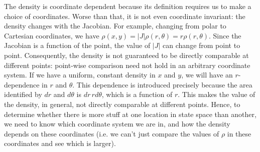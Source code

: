 \documentclass[letterpaper]{article}
\begin{document}
The density is coordinate dependent because its definition requires us to make a choice of coordinates. Worse than that, it is not even coordinate invariant: the density changes with the Jacobian. For example, changing from polar to Cartesian coordinates, we have $\rho(x,y) = |J| \rho(r, \theta) = r \rho(r, \theta)$. Since the Jacobian is a function of the point, the value of $|J|$ can change from point to point. Consequently, the density is not guaranteed to be directly comparable at different points: point-wise comparison need not hold in an arbitrary coordinate system. If we have a uniform, constant density in $x$ and $y$, we will have an $r$-dependence in $r$ and $\theta$. This dependence is introduced precisely because the area identified by $dr$ and $d\theta$ is $dr \,r d\theta$, which is a function of $r$. This makes the value of the density, in general, not directly comparable at different points. Hence, to determine whether there is more stuff at one location in state space than another, we need to know which coordinate system we are in, and how the density depends on these coordinates (i.e. we can't just compare the values of $\rho$ in these coordinates and see which is larger).
\end{document}
